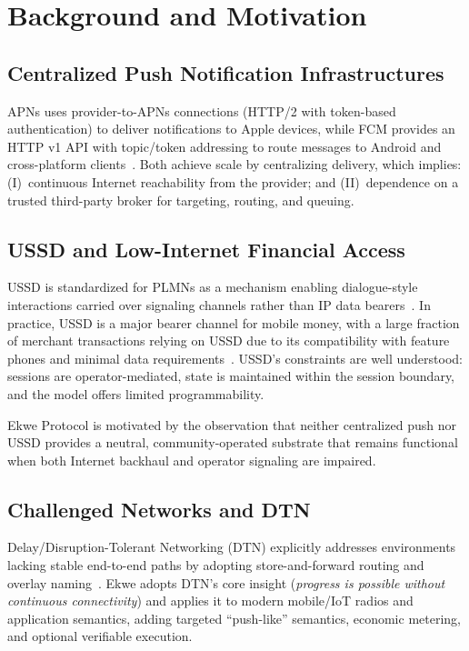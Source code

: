 \documentclass[11pt,a4paper]{article}
\begin{document}
\section{Background and Motivation}

\subsection{Centralized Push Notification Infrastructures}

APNs uses provider-to-APNs connections (HTTP/2 with token-based authentication) to deliver notifications to Apple devices, while FCM provides an HTTP v1 API with topic/token addressing to route messages to Android and cross-platform clients~\cite{apns,fcm}. Both achieve scale by centralizing delivery, which implies: (I)~continuous Internet reachability from the provider; and (II)~dependence on a trusted third-party broker for targeting, routing, and queuing.

\subsection{USSD and Low-Internet Financial Access}

USSD is standardized for PLMNs as a mechanism enabling dialogue-style interactions carried over signaling channels rather than IP data bearers~\cite{etsi_ussd_stage1,etsi_ussd_stage2}. In practice, USSD is a major bearer channel for mobile money, with a large fraction of merchant transactions relying on USSD due to its compatibility with feature phones and minimal data requirements~\cite{gsma_ussd}. USSD's constraints are well understood: sessions are operator-mediated, state is maintained within the session boundary, and the model offers limited programmability.

Ekwe Protocol is motivated by the observation that neither centralized push nor USSD provides a neutral, community-operated substrate that remains functional when both Internet backhaul and operator signaling are impaired.

\subsection{Challenged Networks and DTN}

Delay/Disruption-Tolerant Networking (DTN) explicitly addresses environments lacking stable end-to-end paths by adopting store-and-forward routing and overlay naming~\cite{rfc4838}. Ekwe adopts DTN's core insight (\textit{progress is possible without continuous connectivity}) and applies it to modern mobile/IoT radios and application semantics, adding targeted ``push-like'' semantics, economic metering, and optional verifiable execution.
\end{document}
